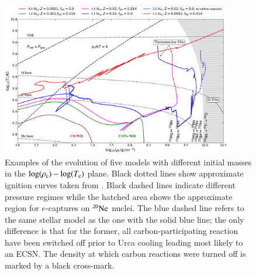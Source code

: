 \documentclass[main.tex]{subfiles}
\begin{document}
\begin{figure}[h!]
    \centering
    \includegraphics[width=0.9\textwidth]{figures/chapter2/RhoT/RhoT_series1_final.pdf}
    \caption{Examples of the evolution of five \seriesone models with different initial masses in the $\log(\rho_{\rm c})-\log(T_{\rm c})$ plane. Black dotted lines show approximate ignition curves taken from \mesa. Black dashed lines indicate different pressure regimes while the hatched area shows the approximate region for $e$-captures on $\rm ^{20}Ne$ nuclei. 
    The blue dashed line refers to the same stellar model as the one with the solid blue line; the only difference is that for the former, all carbon-participating reaction have been switched off prior to Urca cooling leading most likely to an ECSN. The density at which carbon reactions were turned off is marked by a black cross-mark.}
    \label{fig:RhoT}
\end{figure}
\end{document}
